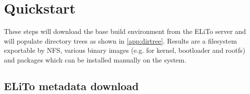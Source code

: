 \chapter{Quickstart}
\label{chap:quickstart}

These steps will download the base build environment from the ELiTo
server and will populate directory trees as shown in
\autoref{app:dirtree}. Results are a filesystem exportable by NFS,
various binary images (e.g. for kernel, bootloader and rootfs) and
packages which can be installed manually on the system.


\section{ELiTo metadata download}
\label{subsec:quickstart_elito-download}

